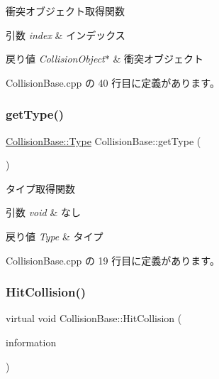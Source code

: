 衝突オブジェクト取得関数 


\begin{DoxyParams}{引数}
{\em index} & インデックス \\
\hline
\end{DoxyParams}

\begin{DoxyRetVals}{戻り値}
{\em Collision\+Object$\ast$} & 衝突オブジェクト \\
\hline
\end{DoxyRetVals}


 Collision\+Base.\+cpp の 40 行目に定義があります。

\mbox{\label{class_collision_base_a9ab6ff88dc0379278229342d4e016744}} 
\subsubsection{\texorpdfstring{get\+Type()}{getType()}}
{\footnotesize\ttfamily \mbox{\hyperlink{class_collision_base_a18dc0d5461742083ca12013fe9ff1a20}{Collision\+Base\+::\+Type}} Collision\+Base\+::get\+Type (\begin{DoxyParamCaption}{ }\end{DoxyParamCaption})}



タイプ取得関数 


\begin{DoxyParams}{引数}
{\em void} & なし \\
\hline
\end{DoxyParams}

\begin{DoxyRetVals}{戻り値}
{\em Type} & タイプ \\
\hline
\end{DoxyRetVals}


 Collision\+Base.\+cpp の 19 行目に定義があります。

\mbox{\label{class_collision_base_a610bcd9fec0c561949cd58fd01cd9a77}} 
\subsubsection{\texorpdfstring{Hit\+Collision()}{HitCollision()}}
{\footnotesize\ttfamily virtual void Collision\+Base\+::\+Hit\+Collision (\begin{DoxyParamCaption}\item[{\mbox{\hyperlink{class_collision_information}{Collision\+Information}} $\ast$}]{information }\end{DoxyParamCaption})\hspace{0.3cm}{\ttfamily [pure virtual]}}



